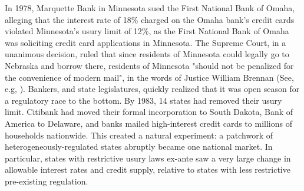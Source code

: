 \documentclass[12pt,english]{article}
\begin{document}
In 1978, Marquette Bank in Minnesota sued the First National Bank of Omaha, alleging that the interest rate of 18\% charged on the Omaha bank's credit cards violated Minnesota's usury limit of 12\%, as the First National Bank of Omaha was soliciting credit card applications in Minnesota. The Supreme Court, in a unanimous decision, ruled that since residents of Minnesota could legally go to Nebraska and borrow there, residents of Minnesota "should not be penalized for the convenience of modern mail", in the words of Justice William Brennan (See, e.g, \cite{hyman_borrow_2012}). Bankers, and state legislatures, quickly realized that it was open season for a regulatory race to the bottom. By 1983, 14 states had removed their usury limit. Citibank had moved their formal incorporation to South Dakota, Bank of America to Delaware, and banks mailed high-interest credit cards to millions of households nationwide. This created a natural experiment: a patchwork of heterogeneously-regulated states abruptly became one national market. In particular, states with restrictive usury laws ex-ante saw a very large change in allowable interest rates and credit supply, relative to states with less restrictive pre-existing regulation.
\end{document}

